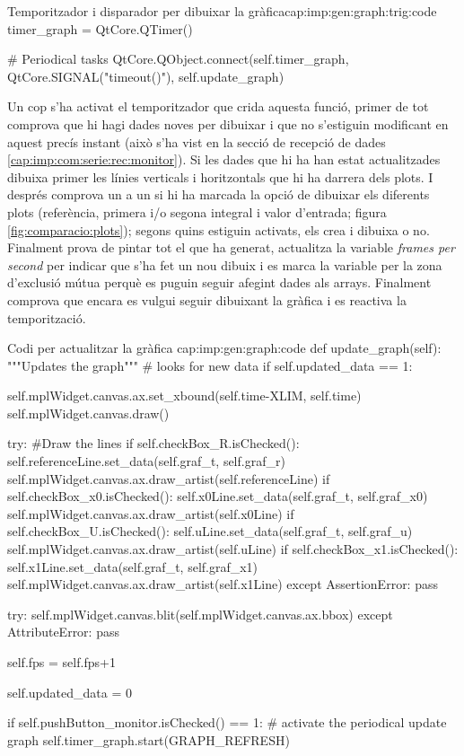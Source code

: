 \begin{code_python}{Temporitzador i disparador per dibuixar la gràfica}{cap:imp:gen:graph:trig:code}
timer_graph = QtCore.QTimer()

# Periodical tasks
QtCore.QObject.connect(self.timer_graph, QtCore.SIGNAL("timeout()"), self.update_graph)
\end{code_python}

Un cop s'ha activat el temporitzador que crida aquesta funció, primer de tot comprova que hi hagi dades noves per dibuixar i que no s'estiguin modificant en aquest precís instant (això s'ha vist en la secció de recepció de dades \ref{cap:imp:com:serie:rec:monitor}). Si les dades que hi ha han estat actualitzades dibuixa primer les línies verticals i horitzontals que hi ha darrera dels plots. I després comprova un a un si hi ha marcada la opció de dibuixar els diferents plots (referència, primera i/o segona integral i valor d'entrada; figura \ref{fig:comparacio:plots}); segons quins estiguin activats, els crea i dibuixa o no. Finalment prova de pintar tot el que ha generat, actualitza la variable \emph{frames per second} per indicar que s'ha fet un nou dibuix i es marca la variable per la zona d'exclusió mútua perquè es puguin seguir afegint dades als arrays.
Finalment comprova que encara es vulgui seguir dibuixant la gràfica i es reactiva la temporització.
        
\begin{code_python}{Codi per actualitzar la gràfica }{cap:imp:gen:graph:code}
def update_graph(self):
    """Updates the graph"""
    # looks for new data
    if self.updated_data == 1:
                  
        self.mplWidget.canvas.ax.set_xbound(self.time-XLIM, self.time)
        self.mplWidget.canvas.draw()

        try:
            #Draw the lines
            if self.checkBox_R.isChecked():
                self.referenceLine.set_data(self.graf_t, self.graf_r)
                self.mplWidget.canvas.ax.draw_artist(self.referenceLine)
            if self.checkBox_x0.isChecked():
                self.x0Line.set_data(self.graf_t, self.graf_x0)
                self.mplWidget.canvas.ax.draw_artist(self.x0Line)
            if self.checkBox_U.isChecked():
                self.uLine.set_data(self.graf_t, self.graf_u)
                self.mplWidget.canvas.ax.draw_artist(self.uLine)
            if self.checkBox_x1.isChecked():
                self.x1Line.set_data(self.graf_t, self.graf_x1)
                self.mplWidget.canvas.ax.draw_artist(self.x1Line)
        except AssertionError:
            pass
            
        try:
            self.mplWidget.canvas.blit(self.mplWidget.canvas.ax.bbox)
        except AttributeError:
            pass
        
        self.fps = self.fps+1
        
        self.updated_data = 0
        
    if self.pushButton_monitor.isChecked() == 1:
        # activate the periodical update graph
        self.timer_graph.start(GRAPH_REFRESH)
\end{code_python}


